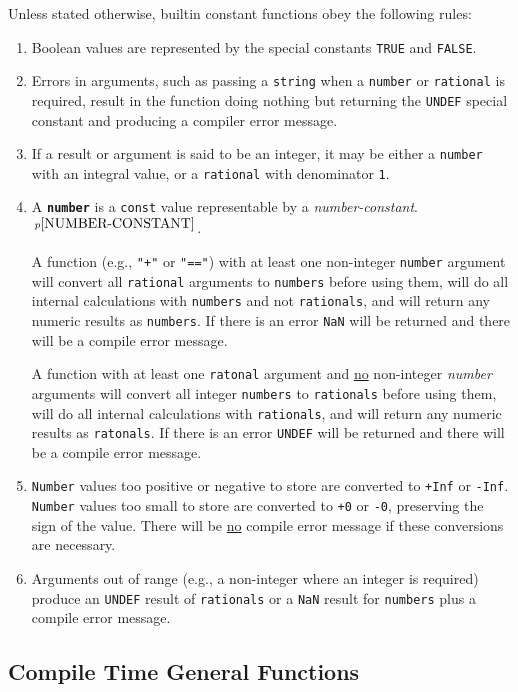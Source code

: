 \documentclass[12pt]{article}
\newcommand{\ttkey}[1]{{\tt \bfseries #1}}
\newcommand{\pagnote}[1]{$\,^{p\pageref{#1}}$}
\begin{document}
Unless stated otherwise, builtin constant functions
obey the following rules:
\begin{enumerate}
\item
Boolean values are represented by the special constants
{\tt TRUE} and {\tt FALSE}.
\item
Errors in arguments, such as passing a {\tt string} when a
{\tt number} or {\tt rational} is required, result in the
function doing nothing but returning
the {\tt UNDEF} special constant and producing
a compiler error message.
\item
If a result or argument is said to be an integer, it may
be either a {\tt number} with an integral value, or a
{\tt rational} with denominator {\tt 1}.
\item\label{NUMBER-RULE}
A \ttkey{number} is a {\tt const} value representable by a
{\em number-constant}.\pagnote{NUMBER-CONSTANT}.

A function (e.g., {\tt "+"} or {\tt "=="})
with at least one non-integer {\tt number} argument will
convert all {\tt rational} arguments to {\tt numbers}
before using them, will do all internal calculations with
{\tt numbers} and not {\tt rationals},
and will return any numeric results as {\tt numbers}.
If there is an error {\tt NaN} will be returned and there will
be a compile error message.

A function with at least one {\tt ratonal} argument and
\underline{no} non-integer {\em number} arguments will
convert all integer {\tt numbers} to {\tt rationals}
before using them, will do all internal calculations with
{\tt rationals}, and will return any numeric results as {\tt ratonals}.
If there is an error {\tt UNDEF} will be returned and there will
be a compile error message.

\item
{\tt Number} values too positive or negative to store
are converted to {\tt +Inf} or {\tt -Inf}.
{\tt Number} values too small to store
are converted to {\tt +0} or {\tt -0}, preserving the
sign of the value.  There will be \underline{no} compile
error message if these conversions are necessary.

\item
Arguments out of range (e.g., a non-integer where an integer is required)
produce an {\tt UNDEF} result of {\tt rationals} or a {\tt NaN} result
for {\tt numbers} plus a compile error message.
\end{enumerate}

\subsection{Compile Time General Functions}
\end{document}
